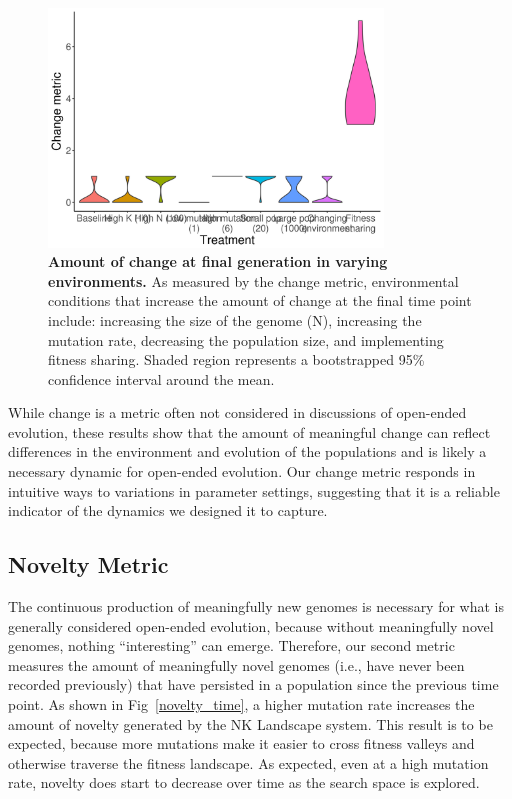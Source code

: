 \documentclass[letterpaper]{article}
\begin{document}
\begin{figure}
\includegraphics[width=3.5in]{figs/changeboxplots.png}
\caption{\textbf{Amount of change at final generation in varying environments.} As measured by the change metric, environmental conditions that increase the amount of change at the final time point include: increasing the size of the genome (N), increasing the mutation rate, decreasing the population size, and implementing fitness sharing. Shaded region represents a bootstrapped 95\% confidence interval around the mean.}
\label{change}
\end{figure}

While change is a metric often not considered in discussions of open-ended evolution, these results show that the amount of meaningful change can reflect differences in the environment and evolution of the populations and is likely a necessary dynamic for open-ended evolution. Our change metric responds in intuitive ways to variations in parameter settings, suggesting that it is a reliable indicator of the dynamics we designed it to capture. 

\subsection{Novelty Metric}
The continuous production of meaningfully new genomes is necessary for what is generally considered open-ended evolution, because without meaningfully novel genomes, nothing ``interesting'' can emerge. Therefore, our second metric measures the amount of meaningfully novel genomes (i.e., have never been recorded previously) that have persisted in a population since the previous time point. As shown in Fig~\ref{novelty_time}, a higher mutation rate increases the amount of novelty generated by the NK Landscape system. This result is to be expected, because more mutations make it easier to cross fitness valleys and otherwise traverse the fitness landscape. As expected, even at a high mutation rate, novelty does start to decrease over time as the search space is explored.
\end{document}
